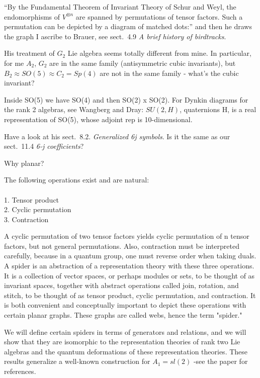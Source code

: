 \begin{description}
``By the Fundamental Theorem of Invariant Theory of Schur and Weyl, the
endomorphisms of $V^{\otimes{n}}$ are spanned by permutations of tensor
factors. Such a permutation can be depicted by a diagram of matched
dots:''
and then he draws the graph I ascribe to Brauer, see
 {sect.~4.9}
{\em A brief history of birdtracks}.

His treatment of $G_2$ Lie algebra seems totally different from mine.
In particular, for me  $A_2$,  $G_2$ are in the same family (antisymmetric
cubic invariants), but  $B_2\approx{SO(5)}\approx{C_2=Sp(4)}$ are not in
the same family - what's the cubic invariant?

Inside SO(5) we have SO(4) and then SO(2) x SO(2).
For Dynkin diagrams for the rank 2 algebras, see
{Wangberg and Dray}:
$SU(2,H)$, quaternions H, is a real representation of  SO(5),
whose adjoint rep is 10-dimensional.

Have a look at his sect.~8.2. {\em Generalized 6j symbols}. Is
it the same as our
 {sect.~11.4}
{\em 6-j coefficients}?

Why planar?

The following operations exist and are natural:
\\\\
1. Tensor product\\
2. Cyclic permutation\\
3. Contraction

A cyclic permutation of two
tensor factors yields cyclic permutation of n tensor factors, but not general permutations.
Also, contraction must be interpreted carefully, because in a quantum group,
one must reverse order when taking duals.
A spider is an abstraction of a representation theory with these three operations.
It is a collection of vector spaces, or perhaps modules or sets, to be thought of as
invariant spaces, together with abstract operations called join, rotation, and stitch,
to be thought of as tensor product, cyclic permutation, and contraction. It is both
convenient and conceptually important to depict these operations with certain planar
graphs. These graphs are called webs, hence the term "spider."

We will define certain spiders in terms of generators and relations,
and we will show that they are isomorphic to the representation theories of rank
two Lie algebras and the quantum deformations of these representation theories.
These results generalize a well-known construction for
$A_1=sl(2)$ -see the paper for references.


\end{description}
